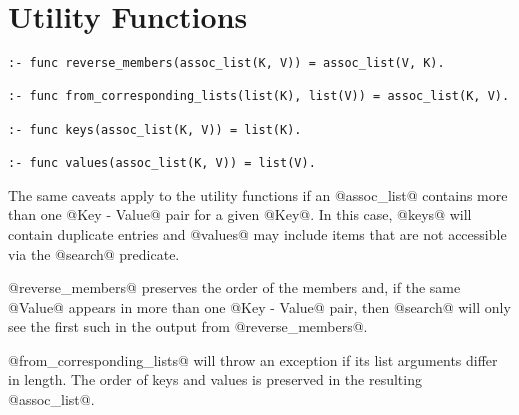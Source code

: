 \section{Utility Functions}

\begin{verbatim}
:- func reverse_members(assoc_list(K, V)) = assoc_list(V, K).

:- func from_corresponding_lists(list(K), list(V)) = assoc_list(K, V).

:- func keys(assoc_list(K, V)) = list(K).

:- func values(assoc_list(K, V)) = list(V).
\end{verbatim}
The same caveats apply to the utility functions if an @assoc_list@
contains more than one @Key - Value@ pair for a given @Key@.  In this
case, @keys@ will contain duplicate entries and @values@ may include items
that are not accessible via the @search@ predicate.

@reverse_members@ preserves the order of the members and, if the same
@Value@ appears in more than one @Key - Value@ pair, then @search@ will
only see the first such in the output from @reverse_members@.  

@from_corresponding_lists@ will throw an exception if its list arguments
differ in length.  The order of keys and values is preserved in the
resulting @assoc_list@.

